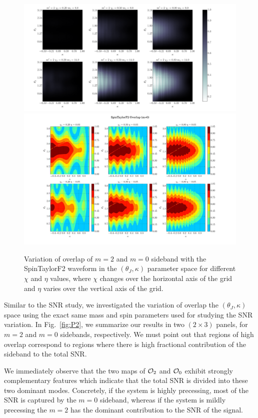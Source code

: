 \label{fig:P2}  
\begin{figure}[!htp]
\includegraphics[width=\textwidth]{./images/OVLP_GRID_P2.pdf}
\includegraphics[width=\textwidth]{./images/OVLP_GRID_P0.pdf} \caption{Variation
of overlap of $m=2$ and $m=0$ sideband with the SpinTaylorF2
waveform in the $(\theta_J, \kappa)$ parameter space for  different $\chi$ and
$\eta$ values, where $\chi$ changes over the horizontal axis of the grid and
$\eta$ varies over the vertical axis of the grid.}  
\centering  
\end{figure}

Similar to the SNR study, we investigated the variation of overlap the
$(\theta_J, \kappa)$ space using the exact same mass and spin parameters used
for studying the SNR variation. In Fig.~\ref{fig:P2}, we summarize our results
in two $(2 \times 3)$ panels, for $m=2$ and $m=0$ sidebands, respectively. We
must point out that regions of high overlap correspond to regions where there
is high fractional contribution of the sideband to the total SNR.

We immediately observe that the two maps of ${\cal{O}}_2$ and ${\cal{O}}_0$
exhibit strongly complementary features which indicate that the total SNR is
divided into these two dominant modes. Concretely, if the
system is highly precessing, most of the SNR is captured by the $m=0$
sideband, whereas if the system is mildly precessing the $m=2$ has the
dominant contribution to the SNR of the signal.  

